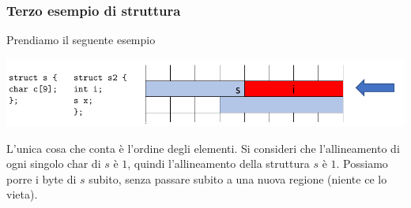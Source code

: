 			\subsubsection{Terzo esempio di struttura}
			Prendiamo il seguente esempio
			\begin{center}
				\includegraphics[scale=0.80]{img/18.PNG}
			\end{center} 
			L'unica cosa che conta è l'ordine degli elementi. Si consideri che l'allineamento di ogni singolo char di $s$ è $1$, quindi l'allineamento della struttura $s$ è $1$. Possiamo porre i byte di $s$ subito, senza passare subito a una nuova regione (niente ce lo vieta).